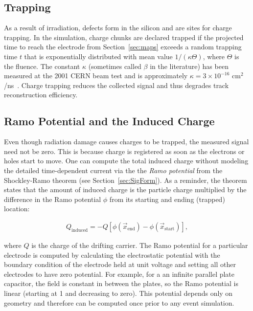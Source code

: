 \subsection{Trapping}
\label{sec:chargetrapping}

As a result of irradiation, defects form in the silicon and are sites for charge trapping.  In the simulation, charge chunks are declared trapped if the projected time to reach the electrode from Section~\ref{sec:maps} exceeds a random trapping time $t$ that is exponentially distributed with mean value $1/(\kappa\Theta)$, where $\Theta$ is the fluence.  The constant $\kappa$ (sometimes called $\beta$ in the literature) has been measured at the 2001 CERN  beam test and is approximately $\kappa=3\times 10^{-16}$ cm${}^2$/ns~\cite{trapping2}.  Charge trapping reduces the collected signal and thus degrades track reconstruction efficiency.

\subsection{Ramo Potential and the Induced Charge}
\label{sec:ramo}

Even though radiation damage causes charges to be trapped, the measured signal need not be zero.  This is because charge is registered as soon as the electrons or holes start to move.  One can compute the total induced charge without modeling the detailed time-dependent current via the the \textit{Ramo potential} from the Shockley-Ramo theorem (see Section~\ref{sec:SigForm}).  As a reminder, the theorem states that the amount of induced charge is the particle charge multiplied by the difference in the Ramo potential $\phi$ from its starting and ending (trapped) location:

\begin{align}
\label{eq:ramo}
Q_\text{induced} = -Q[\phi(\vec{x}_\text{end})-\phi(\vec{x}_\text{start})],
\end{align}

where $Q$ is the charge of the drifting carrier.  The Ramo potential for a particular electrode is computed by calculating the electrostatic potential with the boundary condition of the electrode held at unit voltage and setting all other electrodes to have zero potential.  For example, for a an infinite parallel plate capacitor, the field is constant in between the plates, so the Ramo potential is linear (starting at 1 and decreasing to zero).  This potential depends only on geometry and therefore can be computed once prior to any event simulation.   

